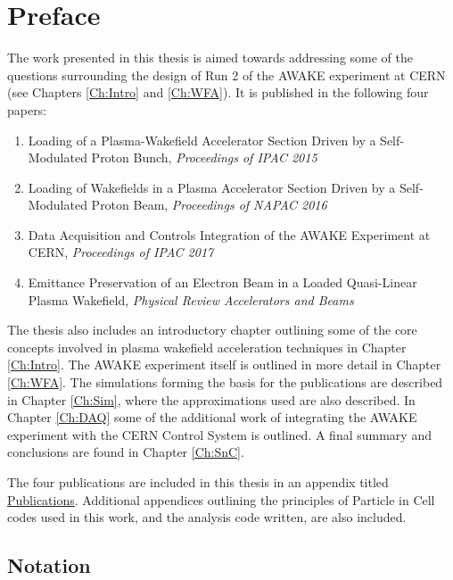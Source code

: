 \chapter*{Preface}

The work presented in this thesis is aimed towards addressing some of the questions surrounding the design of Run 2 of the AWAKE experiment at CERN (see Chapters \ref{Ch:Intro} and \ref{Ch:WFA}). It is published in the following four papers:

\begin{enumerate}[I]
    \item Loading of a Plasma-Wakefield Accelerator Section Driven by a Self-Modulated Proton Bunch, \emph{Proceedings of IPAC 2015} \cite{berglyd_olsen:2015}
    \item Loading of Wakefields in a Plasma Accelerator Section Driven by a Self-Modulated Proton Beam, \emph{Proceedings of NAPAC 2016} \cite{berglyd_olsen:2016}
    \item Data Acquisition and Controls Integration of the AWAKE Experiment at CERN, \emph{Proceedings of IPAC 2017} \cite{berglyd_olsen:2017}
    \item Emittance Preservation of an Electron Beam in a Loaded Quasi-Linear Plasma Wakefield, \emph{Physical Review Accelerators and Beams} \cite{berglyd_olsen:2017a}
\end{enumerate}

The thesis also includes an introductory chapter outlining some of the core concepts involved in plasma wakefield acceleration techniques in Chapter \ref{Ch:Intro}. The AWAKE experiment itself is outlined in more detail in Chapter \ref{Ch:WFA}. The simulations forming the basis for the publications are described in Chapter \ref{Ch:Sim}, where the approximations used are also described. In Chapter \ref{Ch:DAQ} some of the additional work of integrating the AWAKE experiment with the CERN Control System is outlined. A final summary and conclusions are found in Chapter \ref{Ch:SnC}.

\noindent The four publications are included in this thesis in an appendix titled \hyperref[A:Pub]{Publications}. Additional appendices outlining the principles of Particle in Cell codes used in this work, and the analysis code written, are also included.

\newpage
\section*{Notation}

